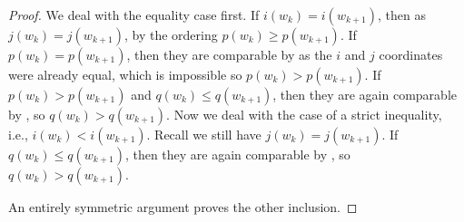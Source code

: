 \begin{proof}
    We deal with the equality case first.
    If $i(w_k)= i(w_{k+1})$, then as $j(w_k)= j(w_{k+1})$, by the ordering $p(w_k)\geq p(w_{k+1})$.
    If $p(w_k)= p(w_{k+1})$, then they are comparable by  as the $i$ and $j$ coordinates were already equal, which is impossible so $p(w_k)> p(w_{k+1})$.
    If $p(w_k)> p(w_{k+1})$ and $q(w_k)\leq q(w_{k+1})$, then they are again comparable by , so $q(w_k)>  q(w_{k+1})$.
    Now we deal with the case of a strict inequality, i.e., $i(w_k)< i(w_{k+1})$.
    Recall we still have $j(w_k)= j(w_{k+1})$.
    If $q(w_k)\leq q(w_{k+1})$, then they are again comparable by , so $q(w_k)>  q(w_{k+1})$.
    
    An entirely symmetric argument proves the other inclusion.
\end{proof}